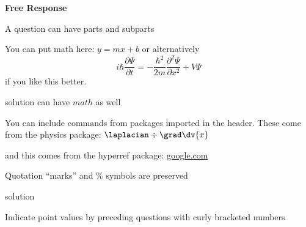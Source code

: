 \documentclass{exam}
\begin{document}
\newpage
\par\noindent \textbf{\large  Free Response}
\begin{questions}
\setcounter{question}{27}
\question A question can have parts and subparts
\question You can put math here: $y=mx+b$ or alternatively \[i\hbar \frac{\partial \Psi}{\partial t} = -\frac{\hbar^2}{2m}\frac{\partial^2 \Psi}{\partial x^2} + V \Psi\] if you like this better.
	\begin{solution}[20 pt]
	solution can have $math$ as well
	\end{solution}
\question You can include commands from packages imported in the header. These come from the physics package: $\laplacian\div\grad\dv{x}$
	\begin{solution}[20 pt]
	and this comes from the hyperref package: \url{google.com}
	\end{solution}
\question Quotation ``marks'' and \% symbols are preserved
	\begin{solution}[20 pt]
	solution
	\end{solution}
\question[3]  Indicate point values by preceding questions with curly bracketed numbers
	\begin{parts}

\end{parts}
\end{questions}
\end{document}
